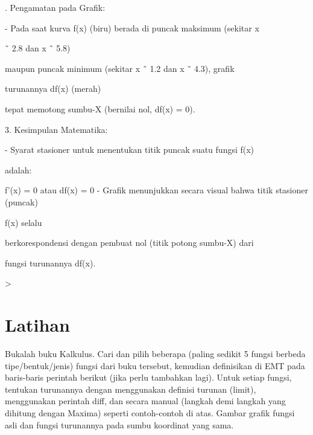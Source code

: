 \documentclass{article}
\newenvironment{eulernotebook}{\par}{\par}
\newcommand{\eulerheading}[1]{\section{#1}}
\newenvironment{eulercomment}{\par\medskip}{\par\medskip}
\begin{document}
\begin{eulernotebook}
\begin{eulercomment}
\begin{eulercomment}
\begin{eulercomment}
\begin{eulercomment}
\begin{eulercomment}
2. Pengamatan pada Grafik:\\
\end{eulercomment}
\begin{eulerttcomment}
   - Pada saat kurva f(x) (biru) berada di puncak maksimum (sekitar x
\end{eulerttcomment}
\begin{eulercomment}
˜ 2.8 dan x ˜ 5.8)\\
\end{eulercomment}
\begin{eulerttcomment}
     maupun puncak minimum (sekitar x ˜ 1.2 dan x ˜ 4.3), grafik
\end{eulerttcomment}
\begin{eulercomment}
turunannya df(x) (merah)\\
\end{eulercomment}
\begin{eulerttcomment}
     tepat memotong sumbu-X (bernilai nol, df(x) = 0).
\end{eulerttcomment}
\begin{eulercomment}

3. Kesimpulan Matematika:\\
\end{eulercomment}
\begin{eulerttcomment}
   - Syarat stasioner untuk menentukan titik puncak suatu fungsi f(x)
\end{eulerttcomment}
\begin{eulercomment}
adalah:\\
\end{eulercomment}
\begin{eulerttcomment}
     f'(x) = 0  atau  df(x) = 0
   - Grafik menunjukkan secara visual bahwa titik stasioner (puncak)
\end{eulerttcomment}
\begin{eulercomment}
f(x) selalu\\
\end{eulercomment}
\begin{eulerttcomment}
     berkorespondensi dengan pembuat nol (titik potong sumbu-X) dari
\end{eulerttcomment}
\begin{eulercomment}
fungsi turunannya df(x).
\end{eulercomment}
\begin{eulerprompt}
>  
\end{eulerprompt}
\eulerheading{Latihan}
\begin{eulercomment}
Bukalah buku Kalkulus. Cari dan pilih beberapa (paling sedikit 5
fungsi berbeda tipe/bentuk/jenis) fungsi dari buku tersebut, kemudian
definisikan di EMT pada baris-baris perintah berikut (jika perlu
tambahkan lagi). Untuk setiap fungsi, tentukan turunannya dengan
menggunakan definisi turunan (limit), menggunakan perintah diff, dan
secara manual (langkah demi langkah yang dihitung dengan Maxima)
seperti contoh-contoh di atas. Gambar grafik fungsi asli dan fungsi
turunannya pada sumbu koordinat yang sama.



\end{eulercomment}
\end{eulercomment}
\end{eulercomment}
\end{eulercomment}
\end{eulercomment}
\end{eulernotebook}
\end{document}
